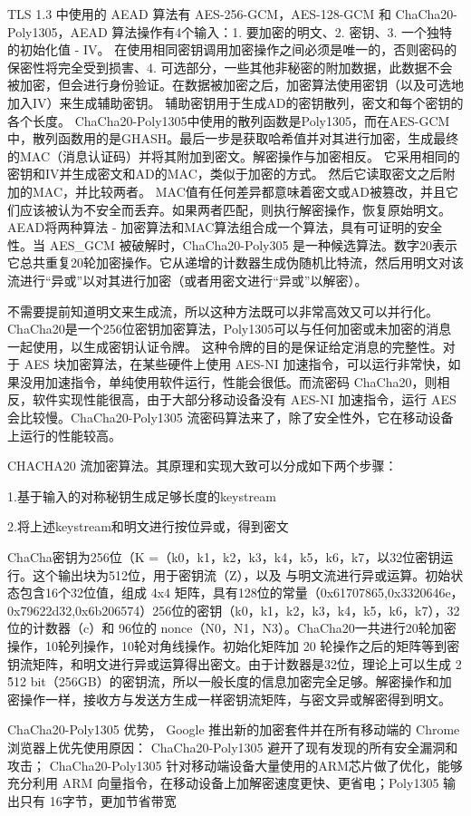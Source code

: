 
TLS 1.3 中使用的 AEAD 算法有 AES-256-GCM，AES-128-GCM 和 ChaCha20-Poly1305，AEAD 算法操作有4个输入：1. 要加密的明文、2. 密钥、3. 一个独特的初始化值 - IV。 在使用相同密钥调用加密操作之间必须是唯一的，否则密码的保密性将完全受到损害、4. 可选部分，一些其他非秘密的附加数据，此数据不会被加密，但会进行身份验证。在数据被加密之后，加密算法使用密钥（以及可选地加入IV）来生成辅助密钥。 辅助密钥用于生成AD的密钥散列，密文和每个密钥的各个长度。 ChaCha20-Poly1305中使用的散列函数是Poly1305，而在AES-GCM中，散列函数用的是GHASH。最后一步是获取哈希值并对其进行加密，生成最终的MAC（消息认证码）并将其附加到密文。解密操作与加密相反。 它采用相同的密钥和IV并生成密文和AD的MAC，类似于加密的方式。 然后它读取密文之后附加的MAC，并比较两者。 MAC值有任何差异都意味着密文或AD被篡改，并且它们应该被认为不安全而丢弃。如果两者匹配，则执行解密操作，恢复原始明文。AEAD将两种算法 - 加密算法和MAC算法组合成一个算法，具有可证明的安全性。当 AES\_GCM 被破解时，ChaCha20-Poly305 是一种候选算法。数字20表示它总共重复20轮加密操作。它从递增的计数器生成伪随机比特流，然后用明文对该流进行“异或”以对其进行加密（或者用密文进行“异或”以解密）。 

不需要提前知道明文来生成流，所以这种方法既可以非常高效又可以并行化。 ChaCha20是一个256位密钥加密算法，Poly1305可以与任何加密或未加密的消息一起使用，以生成密钥认证令牌。 这种令牌的目的是保证给定消息的完整性。对于 AES 块加密算法，在某些硬件上使用 AES-NI 加速指令，可以运行非常快，如果没用加速指令，单纯使用软件运行，性能会很低。而流密码 ChaCha20，则相反，软件实现性能很高，由于大部分移动设备没有 AES-NI 加速指令，运行 AES 会比较慢。ChaCha20-Poly1305 流密码算法来了，除了安全性外，它在移动设备上运行的性能较高。


CHACHA20 流加密算法。其原理和实现大致可以分成如下两个步骤：

1.基于输入的对称秘钥生成足够长度的keystream

2.将上述keystream和明文进行按位异或，得到密文

ChaCha密钥为256位（K =（k0，k1，k2，k3，k4，k5，k6，k7，以32位密钥运行。这个输出块为512位，用于密钥流（Z），以及 与明文流进行异或运算。初始状态包含16个32位值，组成 4x4 矩阵，具有128位的常量（0x61707865,0x3320646e，0x79622d32,0x6b206574）256位的密钥（k0，k1，k2，k3，k4，k5，k6，k7），32位的计数器（c）和 96位的 nonce（N0，N1，N3）。ChaCha20一共进行20轮加密操作，10轮列操作，10轮对角线操作。初始化矩阵加 20 轮操作之后的矩阵等到密钥流矩阵，和明文进行异或运算得出密文。由于计数器是32位，理论上可以生成 2 \^ 512 bit（256GB）的密钥流，所以一般长度的信息加密完全足够。解密操作和加密操作一样，接收方与发送方生成一样密钥流矩阵，与密文异或解密得到明文。

ChaCha20-Poly1305 优势\cite{7507408}，\cite{7927078}
Google 推出新的加密套件并在所有移动端的 Chrome 浏览器上优先使用原因：
ChaCha20-Poly1305 避开了现有发现的所有安全漏洞和攻击；
ChaCha20-Poly1305 针对移动端设备大量使用的ARM芯片做了优化，能够充分利用 ARM 向量指令，在移动设备上加解密速度更快、更省电；Poly1305 输出只有 16字节，更加节省带宽

\afterpage{\null\newpage}
\newpage